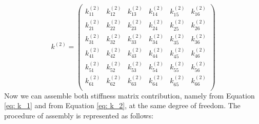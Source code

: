 \begin{equation} \label{eq: k_2}
k^{\left(2\right)} = \begin{pmatrix}
k_{11}^{\left(2\right)} & k_{12}^{\left(2\right)} &  k_{13}^{\left(2\right)} &  k_{14}^{\left(2\right)} & k_{15}^{\left(2\right)}  & k_{16}^{\left(2\right)}   \\[0.3em]
k_{21}^{\left(2\right)} & k_{22}^{\left(2\right)} &  k_{23}^{\left(2\right)} &  k_{24}^{\left(2\right)} & k_{25}^{\left(2\right)}  & k_{26}^{\left(2\right)}   \\[0.3em]
k_{31}^{\left(2\right)} & k_{32}^{\left(2\right)} &  k_{33}^{\left(2\right)} &  k_{34}^{\left(2\right)} & k_{35}^{\left(2\right)}  & k_{36}^{\left(2\right)}   \\[0.3em]
k_{41}^{\left(2\right)} & k_{42}^{\left(2\right)} &  k_{43}^{\left(2\right)} &  k_{44}^{\left(2\right)} & k_{45}^{\left(2\right)}  & k_{46}^{\left(2\right)}   \\[0.3em]
k_{51}^{\left(2\right)} & k_{52}^{\left(2\right)} &  k_{53}^{\left(2\right)} &  k_{54}^{\left(2\right)} & k_{55}^{\left(2\right)}  & k_{56}^{\left(2\right)}   \\[0.3em]
k_{61}^{\left(2\right)} & k_{62}^{\left(2\right)} &  k_{63}^{\left(2\right)} &  k_{64}^{\left(2\right)} & k_{65}^{\left(2\right)}  & k_{66}^{\left(2\right)}   \\[0.3em]
\end{pmatrix} 
\end{equation}	
\clearpage
Now we can assemble both stiffness matrix contribution, namely from Equation \ref{eq: k_1} and from Equation \ref{eq: k_2}, at the same degree of freedom.  The procedure of assembly is represented as follows:
